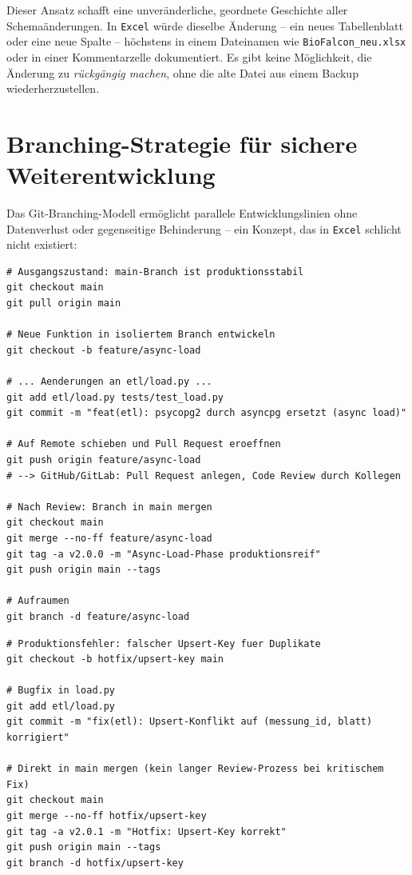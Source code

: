 \documentclass[12pt,a4paper]{report}
\theoremstyle{definition}
\theoremstyle{remark}
\newcommand{\excel}{\texttt{Excel}}
\newcommand{\code}[1]{\texttt{#1}}
\begin{document}
Dieser Ansatz schafft eine unveränderliche, geordnete Geschichte aller
Schemaänderungen. In \excel{} würde dieselbe Änderung -- ein neues
Tabellenblatt oder eine neue Spalte -- höchstens in einem
Dateinamen wie \code{BioFalcon\_neu.xlsx} oder in einer
Kommentarzelle dokumentiert. Es gibt keine Möglichkeit,
die Änderung zu \emph{rückgängig machen}, ohne die alte Datei
aus einem Backup wiederherzustellen.

\section{Branching-Strategie für sichere Weiterentwicklung}

Das Git-Branching-Modell ermöglicht parallele Entwicklungslinien ohne
Datenverlust oder gegenseitige Behinderung -- ein Konzept, das in
\excel{} schlicht nicht existiert:

\begin{lstlisting}[style=bash, caption={Feature-Branch-Workflow (GitHub Flow)}]
# Ausgangszustand: main-Branch ist produktionsstabil
git checkout main
git pull origin main

# Neue Funktion in isoliertem Branch entwickeln
git checkout -b feature/async-load

# ... Aenderungen an etl/load.py ...
git add etl/load.py tests/test_load.py
git commit -m "feat(etl): psycopg2 durch asyncpg ersetzt (async load)"

# Auf Remote schieben und Pull Request eroeffnen
git push origin feature/async-load
# --> GitHub/GitLab: Pull Request anlegen, Code Review durch Kollegen

# Nach Review: Branch in main mergen
git checkout main
git merge --no-ff feature/async-load
git tag -a v2.0.0 -m "Async-Load-Phase produktionsreif"
git push origin main --tags

# Aufraumen
git branch -d feature/async-load
\end{lstlisting}

\begin{lstlisting}[style=bash, caption={Hotfix: Kritischen Bug in Produktion beheben}]
# Produktionsfehler: falscher Upsert-Key fuer Duplikate
git checkout -b hotfix/upsert-key main

# Bugfix in load.py
git add etl/load.py
git commit -m "fix(etl): Upsert-Konflikt auf (messung_id, blatt) korrigiert"

# Direkt in main mergen (kein langer Review-Prozess bei kritischem Fix)
git checkout main
git merge --no-ff hotfix/upsert-key
git tag -a v2.0.1 -m "Hotfix: Upsert-Key korrekt"
git push origin main --tags
git branch -d hotfix/upsert-key
\end{lstlisting}
\end{document}
